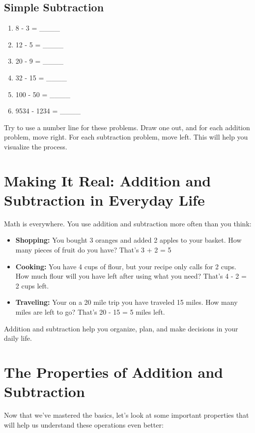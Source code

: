 \subsection{Simple Subtraction}
\begin{enumerate}
    \item 8 - 3 = \_\_\_\_
    \item 12 - 5 = \_\_\_\_
    \item 20 - 9 = \_\_\_\_
    \item 32 - 15 = \_\_\_\_
    \item 100 - 50 = \_\_\_\_
    \item 9534 - 1234 = \_\_\_\_
\end{enumerate}

Try to use a number line for these problems. Draw one out, and for each addition problem, move right. For each subtraction problem, move left. This will help you visualize the process.
\begin{center}
\end{center}

\section{Making It Real: Addition and Subtraction in Everyday Life}
Math is everywhere. You use addition and subtraction more often than you think:
\begin{itemize}
    \item \textbf{Shopping:} You bought 3 oranges and added 2 apples to your basket. How many pieces of fruit do you have? That’s 3 + 2 = 5
    \item \textbf{Cooking:} You have 4 cups of flour, but your recipe only calls for 2 cups. How much flour will you have left after using what you need? That’s 4 - 2 = 2 cups left.
    \item \textbf{Traveling:} Your on a 20 mile trip you have traveled 15 miles. How many miles are left to go? That’s 20 - 15 = 5 miles left.
\end{itemize}

Addition and subtraction help you organize, plan, and make decisions in your daily life.

\section{The Properties of Addition and Subtraction}
Now that we’ve mastered the basics, let’s look at some important properties that will help us understand these operations even better:

